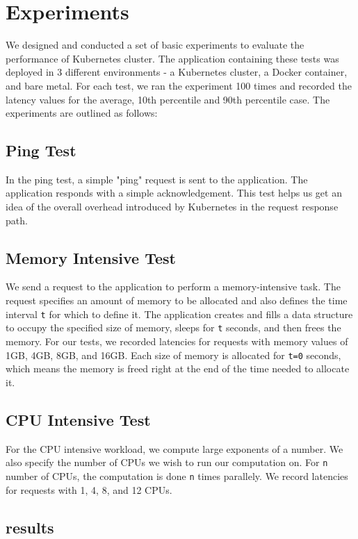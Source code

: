 \documentclass[sigconf]{acmart}
\begin{document}
\section{Experiments}
We designed and conducted a set of basic experiments to evaluate the performance of Kubernetes cluster. The application containing these tests was deployed in 3 different environments - a Kubernetes cluster, a Docker container, and bare metal. For each test, we ran the experiment 100 times and recorded the latency values for the average, 10th percentile and 90th percentile case. The experiments are outlined as follows:

\subsection{Ping Test}
In the ping test, a simple "ping" request is sent to the application. The application responds with a simple acknowledgement. This test helps us get an idea of the overall overhead introduced by Kubernetes in the request response path.

\subsection{Memory Intensive Test}
We send a request to the application to perform a memory-intensive task. The request specifies an amount of memory to be allocated and also defines the time interval \texttt{t} for which to define it. The application creates and fills a data structure to occupy the specified size of memory, sleeps for \texttt{t} seconds, and then frees the memory. For our tests, we recorded latencies for requests with memory values of 1GB, 4GB, 8GB, and 16GB. Each size of memory is allocated for \texttt{t=0} seconds, which means the memory is freed right at the end of the time needed to allocate it. 

\subsection{CPU Intensive Test}
For the CPU intensive workload, we compute large exponents of a number. We also specify the number of CPUs we wish to run our computation on. For \texttt{n} number of CPUs, the computation is done \texttt{n} times parallely. We record latencies for requests with 1, 4, 8, and 12 CPUs.

\subsection{results}
\end{document}
